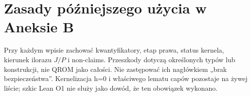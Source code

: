 \documentclass[11pt,a4paper]{article}
\begin{document}
\section{Zasady późniejszego użycia w Aneksie B}
Przy każdym wpisie zachować kwantyfikatory, etap prawa, status kernela,
kierunek ilorazu $J/P$ i non-claims. Przeszkody dotyczą określonych typów
lub konstrukcji, nie QROM jako całości. Nie zastępować ich nagłówkiem
„brak bezpieczeństwa”. Kernelizacja h=0 i właściwego lematu capów pozostaje
na żywej liście; szkic Lean O1 nie służy jako dowód, że ten obowiązek wykonano.
\end{document}
